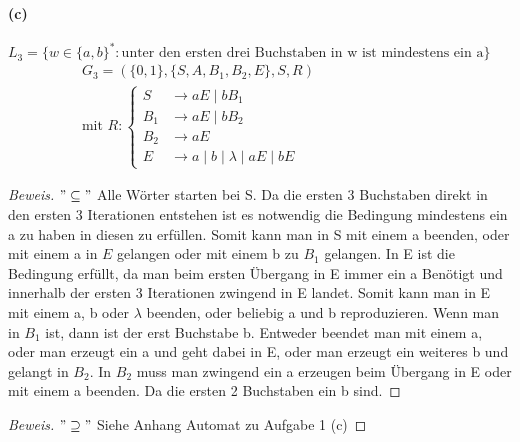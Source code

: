 \documentclass[titlepage]{article}
\renewcommand{\]}{\right]}
\renewcommand{\[}{\left[}
\renewcommand{\)}{\right)}
\renewcommand{\(}{\left(}
\renewcommand{\|}{\;|\;}
\begin{document}
		\paragraph{(c)} $L_3=\{w\in\{a,b\}^*:\text{unter den ersten drei Buchstaben in w ist mindestens ein a}\}$
			\begin{align*}
			G_3=(\{0,1\},\{S,A,B_1,B_2,E\},S,R)&&&&&&&&&&&\\
			\text{mit }R:
			\begin{cases}
				S&\rightarrow aE\|bB_1\\
				B_1&\rightarrow aE\|bB_2\\
				B_2&\rightarrow aE\\
				E&\rightarrow a\|b\|\lambda\|aE\|bE
			\end{cases}
		\end{align*}
		\begin{proof}[Beweis] $"\subseteq"$
			Alle Wörter starten bei S. Da die ersten 3 Buchstaben direkt in den ersten 3 Iterationen entstehen ist es notwendig die Bedingung mindestens ein a zu haben in diesen zu erfüllen. Somit kann man in S mit einem a beenden, oder mit einem a in $E$ gelangen oder mit einem b zu $B_1$ gelangen. In E ist die Bedingung erfüllt, da man beim ersten Übergang in E immer ein a Benötigt und innerhalb der ersten 3 Iterationen zwingend in E landet. Somit kann man in E mit einem a, b oder $\lambda$ beenden, oder beliebig a und b reproduzieren. Wenn man in $B_1$ ist, dann ist der erst Buchstabe b. Entweder beendet man mit einem a, oder man erzeugt ein a und geht dabei in E, oder man erzeugt ein weiteres b und gelangt in $B_2$. In $B_2$ muss man zwingend ein a erzeugen beim Übergang in E oder mit einem a beenden. Da die ersten 2 Buchstaben ein b sind.
		\end{proof}
		\begin{proof}[Beweis] $"\supseteq"$
			Siehe Anhang Automat zu Aufgabe 1 (c)
		\end{proof}
\end{document}
